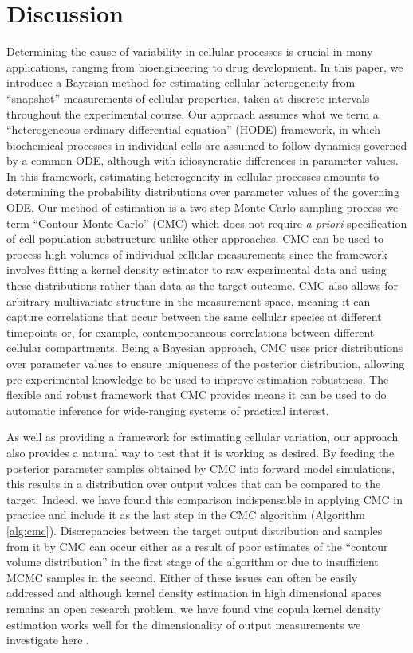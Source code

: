 \section{Discussion}
\label{sec:discussion}
Determining the cause of variability in cellular processes is crucial in many applications, ranging from bioengineering to drug development. In this paper, we introduce a Bayesian method for estimating cellular heterogeneity from ``snapshot'' measurements of cellular properties, taken at discrete intervals throughout the experimental course. Our approach assumes what we term a ``heterogeneous ordinary differential equation'' (HODE) framework, in which biochemical processes in individual cells are assumed to follow dynamics governed by a common ODE, although with idiosyncratic differences in parameter values. In this framework, estimating heterogeneity in cellular processes amounts to determining the probability distributions over parameter values of the governing ODE. Our method of estimation is a two-step Monte Carlo sampling process we term ``Contour Monte Carlo'' (CMC) which does not require \textit{a priori} specification of cell population substructure unlike other approaches. CMC can be used to process high volumes of individual cellular measurements since the framework involves fitting a kernel density estimator to raw experimental data and using these distributions rather than data as the target outcome. CMC also allows for arbitrary multivariate structure in the measurement space, meaning it can capture correlations that occur between the same cellular species at different timepoints or, for example, contemporaneous correlations between different cellular compartments. Being a Bayesian approach, CMC uses prior distributions over parameter values to ensure uniqueness of the posterior distribution, allowing pre-experimental knowledge to be used to improve estimation robustness. The flexible and robust framework that CMC provides means it can be used to do automatic inference for wide-ranging systems of practical interest.

As well as providing a framework for estimating cellular variation, our approach also provides a natural way to test that it is working as desired. By feeding the posterior parameter samples obtained by CMC into forward model simulations, this results in a distribution over output values that can be compared to the target. Indeed, we have found this comparison indispensable in applying CMC in practice and include it as the last step in the CMC algorithm (Algorithm \ref{alg:cmc}). Discrepancies between the target output distribution and samples from it by CMC can occur either as a result of poor estimates of the ``contour volume distribution'' in the first stage of the algorithm or due to insufficient MCMC samples in the second. Either of these issues can often be easily addressed and although kernel density estimation in high dimensional spaces remains an open research problem, we have found vine copula kernel density estimation works well for the dimensionality of output measurements we investigate here \cite{nagler2016evading}.

